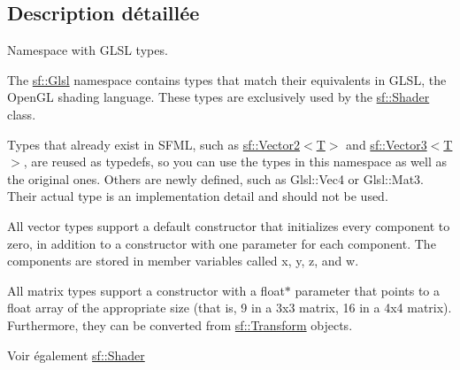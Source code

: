 \subsection{Description détaillée}
Namespace with G\+L\+SL types. 

The \hyperlink{namespacesf_1_1Glsl}{sf\+::\+Glsl} namespace contains types that match their equivalents in G\+L\+SL, the Open\+GL shading language. These types are exclusively used by the \hyperlink{classsf_1_1Shader}{sf\+::\+Shader} class.

Types that already exist in S\+F\+ML, such as \hyperlink{classsf_1_1Vector2}{sf\+::\+Vector2$<$\+T$>$} and \hyperlink{classsf_1_1Vector3}{sf\+::\+Vector3$<$\+T$>$}, are reused as typedefs, so you can use the types in this namespace as well as the original ones. Others are newly defined, such as Glsl\+::\+Vec4 or Glsl\+::\+Mat3. Their actual type is an implementation detail and should not be used.

All vector types support a default constructor that initializes every component to zero, in addition to a constructor with one parameter for each component. The components are stored in member variables called x, y, z, and w.

All matrix types support a constructor with a float$\ast$ parameter that points to a float array of the appropriate size (that is, 9 in a 3x3 matrix, 16 in a 4x4 matrix). Furthermore, they can be converted from \hyperlink{classsf_1_1Transform}{sf\+::\+Transform} objects.

\begin{DoxySeeAlso}{Voir également}
\hyperlink{classsf_1_1Shader}{sf\+::\+Shader} 
\end{DoxySeeAlso}
